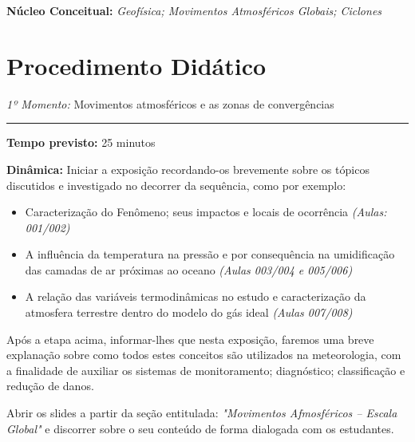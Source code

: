 \noindent\textbf{Núcleo Conceitual:} \emph{Geofísica; Movimentos Atmosféricos Globais; Ciclones}
\newpage

\section*{Procedimento Didático} 
\noindent\emph{1º Momento:} Movimentos atmosféricos e as zonas de convergências
\par\noindent\rule{.3\textwidth}{.5pt}  
\par\noindent\textbf{Tempo previsto:} 25 minutos

\noindent\textbf{Dinâmica:} Iniciar a exposição recordando-os brevemente sobre os tópicos discutidos e investigado no decorrer da sequência, como por exemplo:
\begin{itemize}
		\item Caracterização do Fenômeno; seus impactos e locais de ocorrência \textit{(Aulas: 001/002)}
		\item A influência da temperatura na pressão e por consequência na umidificação das camadas de ar próximas ao oceano \textit{(Aulas 003/004 e 005/006)}
		\item A relação das variáveis termodinâmicas no estudo e caracterização da atmosfera terrestre dentro do modelo do gás ideal \textit{(Aulas 007/008)}
\end{itemize}
Após a etapa acima, informar-lhes que nesta exposição, faremos uma breve explanação sobre como todos estes conceitos são utilizados na meteorologia, com a finalidade de auxiliar os sistemas de monitoramento; diagnóstico; classificação e redução de danos.

Abrir os slides a partir da seção entitulada: \textit{"Movimentos Afmosféricos -- Escala Global"} e discorrer sobre o seu conteúdo de forma dialogada com os estudantes.

